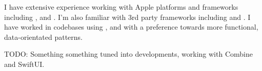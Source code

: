 I have extensive experience working with Apple platforms and frameworks
including ,  and . I'm also
familiar with 3rd party frameworks including  and . I
have worked in codebases using ,  and  with
a preference towards more functional, data-orientated patterns. 

TODO: Something something tuned into developments, working with Combine and SwiftUI.

